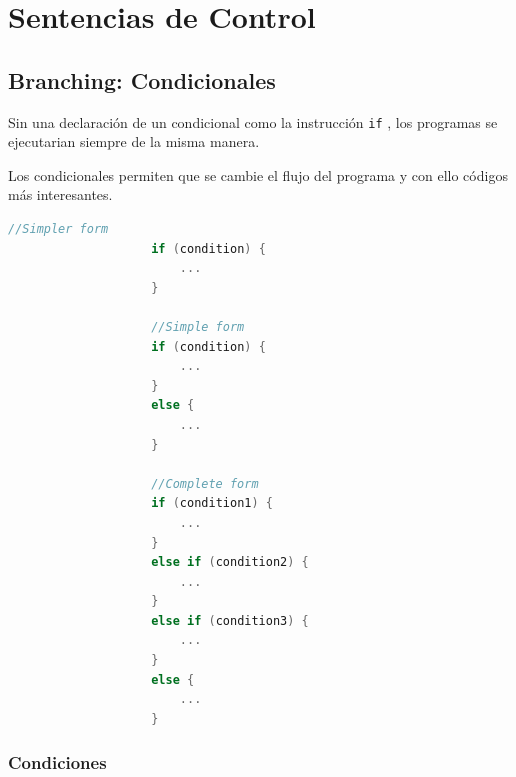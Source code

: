 \documentclass[12pt, fleqn]{report}                             %
\theoremstyle{break}                                            %
\newcommand{\textCode}[1]  { \texttt{#1} }                      %
\begin{document}
        \section{Sentencias de Control}

            \subsection{Branching: Condicionales}

                Sin una declaración de un condicional como la instrucción \textCode{if}, los programas
                se ejecutarian siempre de la misma manera.
                
                Los condicionales permiten que se cambie el flujo del programa y con ello códigos
                más interesantes.
                \begin{lstlisting}[language=C++, gobble=20]
                    //Simpler form
                    if (condition) {
                        ...
                    }

                    //Simple form
                    if (condition) {
                        ...
                    }
                    else {
                        ...
                    }
                    
                    //Complete form
                    if (condition1) {
                        ...
                    }
                    else if (condition2) {
                        ...
                    }
                    else if (condition3) {
                        ...
                    }
                    else {
                        ...
                    }
                \end{lstlisting}


                \clearpage
                \subsubsection{Condiciones}
\end{document}
